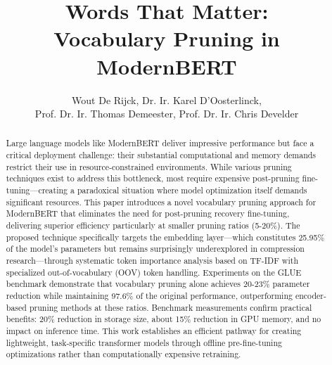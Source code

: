 \documentclass[twocolumn]{article}
\title{\huge \textbf{Words That Matter:\\ Vocabulary Pruning in ModernBERT}}
\author{Wout De Rijck, Dr. Ir. Karel D'Oosterlinck, \\ Prof. Dr. Ir. Thomas Demeester, Prof. Dr. Ir. Chris Develder}
\date{} %
\begin{document}
\maketitle







\begin{abstract}
Large language models like ModernBERT deliver impressive performance but face a critical deployment challenge: their substantial computational and memory demands restrict their use in resource-constrained environments. While various pruning techniques exist to address this bottleneck, most require expensive post-pruning fine-tuning—creating a paradoxical situation where model optimization itself demands significant resources. This paper introduces a novel vocabulary pruning approach for ModernBERT that eliminates the need for post-pruning recovery fine-tuning, delivering superior efficiency particularly at smaller pruning ratios (5-20\%). The proposed technique specifically targets the embedding layer—which constitutes 25.95\% of the model's parameters but remains surprisingly underexplored in compression research—through systematic token importance analysis based on TF-IDF with specialized out-of-vocabulary (OOV) token handling. Experiments on the GLUE benchmark demonstrate that vocabulary pruning alone achieves 20-23\% parameter reduction while maintaining 97.6\% of the original performance, outperforming encoder-based pruning methods at these ratios. 
Benchmark measurements confirm practical benefits: 20\% reduction in storage size, about 15\% reduction in GPU memory, and no impact on inference time. This work establishes an efficient pathway for creating lightweight, task-specific transformer models through offline pre-fine-tuning optimizations rather than computationally expensive retraining.
\end{abstract}
\end{document}

